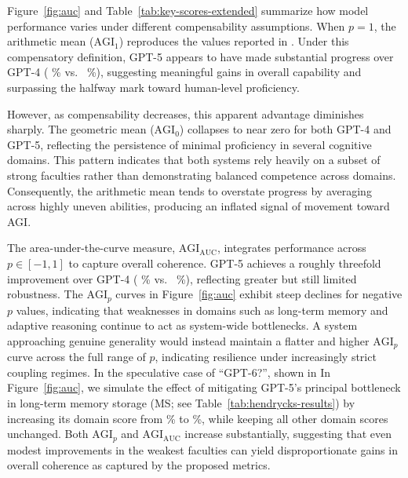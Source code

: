 \documentclass{article}
\newcommand{\score}[1]{%
  \begingroup
  \edef\val{#1}%
  \ifdim \val pt > 50pt
    \textcolor{green!40!black}{#1}%
  \else
    \textcolor{red!40!black}{#1}%
  \fi
  \endgroup
}
\begin{document}
Figure~\ref{fig:auc} and Table~\ref{tab:key-scores-extended} summarize how model performance varies under different compensability assumptions.  
When $p = 1$, the arithmetic mean ($\mathrm{AGI}_1$) reproduces the values reported in \citet{hendrycks2025agidefinition}.  
Under this compensatory definition, GPT-5 appears to have made substantial progress over GPT-4 (\score{58}\% vs.~\score{27}\%), suggesting meaningful gains in overall capability and surpassing the halfway mark toward human-level proficiency.

However, as compensability decreases, this apparent advantage diminishes sharply.  
The geometric mean ($\mathrm{AGI}_0$) collapses to near zero for both GPT-4 and GPT-5, reflecting the persistence of minimal proficiency in several cognitive domains.  
This pattern indicates that both systems rely heavily on a subset of strong faculties rather than demonstrating balanced competence across domains.  
Consequently, the arithmetic mean tends to overstate progress by averaging across highly uneven abilities, producing an inflated signal of movement toward AGI.

The area-under-the-curve measure, $\mathrm{AGI}_{\mathrm{AUC}}$, integrates performance across $p \in [-1,1]$ to capture overall coherence.  
GPT-5 achieves a roughly threefold improvement over GPT-4 (\score{24}\% vs.~\score{7}\%), reflecting greater but still limited robustness.  
The $\mathrm{AGI}_p$ curves in Figure~\ref{fig:auc} exhibit steep declines for negative $p$ values, indicating that weaknesses in domains such as long-term memory and adaptive reasoning continue to act as system-wide bottlenecks.  
A system approaching genuine generality would instead maintain a flatter and higher $\mathrm{AGI}_p$ curve across the full range of $p$, indicating resilience under increasingly strict coupling regimes.  
In the speculative case of ``GPT-6?'', shown in In Figure~\ref{fig:auc}, we simulate the effect of mitigating GPT-5’s principal bottleneck in long-term memory storage (MS; see Table~\ref{tab:hendrycks-results}) by increasing its domain score from \score{0}\% to \score{30}\%, while keeping all other domain scores unchanged. 
Both $\mathrm{AGI}_p$ and $\mathrm{AGI}_{\mathrm{AUC}}$ increase substantially, suggesting that even modest improvements in the weakest faculties can yield disproportionate gains in overall coherence as captured by the proposed metrics.  
\end{document}

